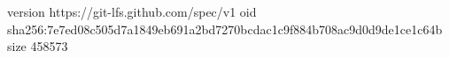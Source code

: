 version https://git-lfs.github.com/spec/v1
oid sha256:7e7ed08c505d7a1849eb691a2bd7270bcdac1c9f884b708ac9d0d9de1ce1c64b
size 458573
